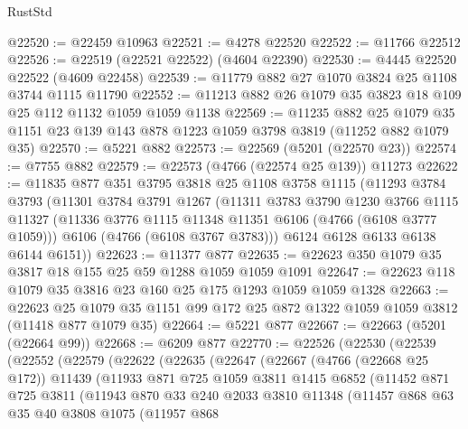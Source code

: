 \begin{lexlean}{RustStd}
\begin{coremodule}
@22520 := @22459 @10963
@22521 := @4278 @22520
@22522 := @11766 @22512
@22526 := @22519 (@22521 @22522) (@4604 @22390)
@22530 := @4445 @22520 @22522 (@4609 @22458)
@22539 := @11779 @882 @27 @1070 @3824 @25 @1108 @3744 @1115 @11790
@22552 := @11213 @882 @26 @1079 @35 @3823 @18 @109 @25 @112 @1132 @1059 @1059 @1138
@22569 := @11235
    @882
    @25
    @1079
    @35
    @1151
    @23
    @139
    @143
    @878
    @1223
    @1059
    @3798
    @3819
    (@11252 @882 @1079 @35)
@22570 := @5221 @882
@22573 := @22569 (@5201 (@22570 @23))
@22574 := @7755 @882
@22579 := @22573 (@4766 (@22574 @25 @139)) @11273
@22622 := @11835
    @877
    @351
    @3795
    @3818
    @25
    @1108
    @3758
    @1115
    (@11293
      @3784
      @3793
      (@11301
        @3784
        @3791
        @1267
        (@11311
          @3783
          @3790
          @1230
          @3766
          @1115
          @11327
          (@11336 @3776 @1115 @11348 @11351 @6106 (@4766 (@6108 @3777 @1059)))
          @6106
          (@4766 (@6108 @3767 @3783)))
        @6124
        @6128
        @6133
        @6138
        @6144
        @6151))
@22623 := @11377 @877
@22635 := @22623 @350 @1079 @35 @3817 @18 @155 @25 @59 @1288 @1059 @1059 @1091
@22647 := @22623 @118 @1079 @35 @3816 @23 @160 @25 @175 @1293 @1059 @1059 @1328
@22663 := @22623
    @25
    @1079
    @35
    @1151
    @99
    @172
    @25
    @872
    @1322
    @1059
    @1059
    @3812
    (@11418 @877 @1079 @35)
@22664 := @5221 @877
@22667 := @22663 (@5201 (@22664 @99))
@22668 := @6209 @877
@22770 := @22526
    (@22530
      (@22539
        (@22552
          (@22579
            (@22622
              (@22635
                (@22647
                  (@22667
                    (@4766 (@22668 @25 @172))
                    @11439
                    (@11933
                      @871
                      @725
                      @1059
                      @3811
                      @1415
                      @6852
                      (@11452
                        @871
                        @725
                        @3811
                        (@11943
                          @870
                          @33
                          @240
                          @2033
                          @3810
                          @11348
                          (@11457
                            @868
                            @63
                            @35
                            @40
                            @3808
                            @1075
                            (@11957
                              @868

\end{coremodule}
\end{lexlean}
